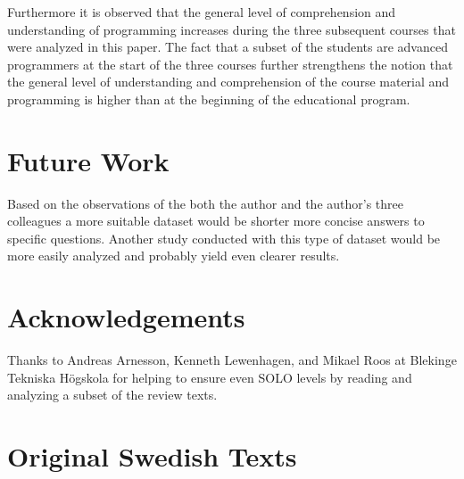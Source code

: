 \documentclass[twoside,twocolumn,a4paper,11pt,english]{article}
\begin{document}
Furthermore it is observed that the general level of comprehension and understanding of programming increases during the three subsequent courses that were analyzed in this paper. The fact that a subset of the students are advanced programmers at the start of the three courses further strengthens the notion that the general level of understanding and comprehension of the course material and programming is higher than at the beginning of the educational program.




\section{Future Work}

Based on the observations of the both the author and the author's three colleagues a more suitable dataset would be shorter more concise answers to specific questions. Another study conducted with this type of dataset would be more easily analyzed and probably yield even clearer results.




\section{Acknowledgements}

Thanks to Andreas Arnesson, Kenneth Lewenhagen, and Mikael Roos at Blekinge Tekniska Högskola for helping to ensure even SOLO levels by reading and analyzing a subset of the review texts.







\newpage

\appendix

\section{Original Swedish Texts} \label{app:original}
\end{document}
